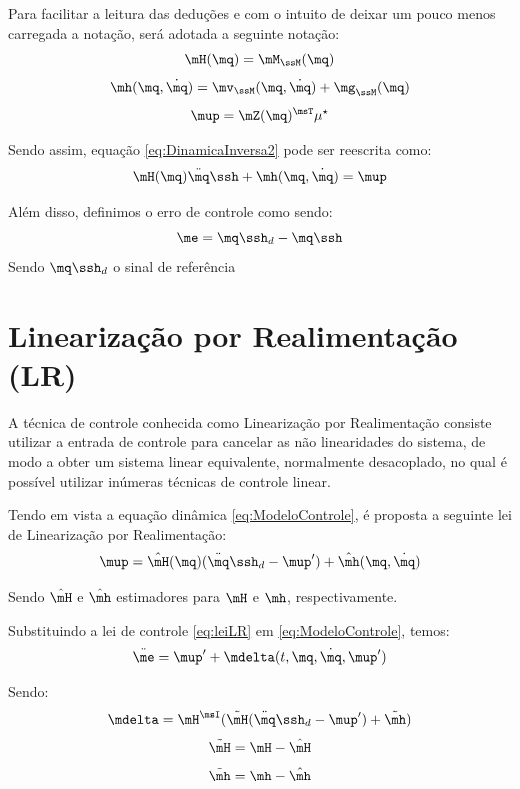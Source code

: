 \documentclass[]{politex}
\begin{document}
Para facilitar a leitura das deduções e com o intuito de deixar um pouco menos carregada a notação, será adotada a seguinte notação:
\begin{equation}
\mH(\mq) = \mM_{\ssM}(\mq)
\end{equation}
\begin{equation}
\mh(\mq, \dot{\mq}) = \mv_{\ssM}(\mq, \dot{\mq}) + \mg_{\ssM}(\mq)
\end{equation}
\begin{equation}
\mup = \mZ(\mq)^{\msT} \mu^\star
\end{equation}

Sendo assim, equação \eqref{eq:DinamicaInversa2} pode ser reescrita como:
\begin{equation} \label{eq:ModeloControle}
\mH(\mq)  \ddot{\mq}\ssh + \mh(\mq,\dot{\mq}) = \mup
\end{equation}

Além disso, definimos o erro de controle como sendo:
\begin{equation}
\me = \mq\ssh_d - \mq\ssh
\end{equation}
Sendo $\mq\ssh_d$ o sinal de referência

\section{Linearização por Realimentação (LR)}

A técnica de controle conhecida como Linearização por Realimentação consiste utilizar a entrada de controle para cancelar as não linearidades do sistema, de modo a obter um sistema linear equivalente, normalmente desacoplado, no qual é possível utilizar inúmeras técnicas de controle linear.

Tendo em vista a equação dinâmica \eqref{eq:ModeloControle}, é proposta a seguinte lei de Linearização por Realimentação:
\begin{equation} \label{eq:leiLR}
\mup = \hat{\mH}(\mq) (\ddot{\mq}\ssh_d - \mup' ) + \hat{\mh}(\mq,\dot{\mq})
\end{equation}

Sendo $\hat{\mH}$ e $\hat{\mh}$ estimadores para $\mH$ e $\mh$, respectivamente.

Substituindo a lei de controle \eqref{eq:leiLR} em \eqref{eq:ModeloControle}, temos:
\begin{equation} \label{eq:ModeloLin}
\ddot{\me}  = \mup' + \mdelta(t,\mq,\dot{\mq}, \mup')
\end{equation}

Sendo:
\begin{equation}
\mdelta = \mH^\msI( \tilde{\mH}(\ddot{\mq}\ssh_d - \mup') + \tilde{\mh} )
\end{equation}
\begin{equation} \label{eq:Htil}
\tilde{\mH} = \mH - \hat{\mH}
\end{equation} 
\begin{equation} \label{eq:htil}
\tilde{\mh} = \mh - \hat{\mh}
\end{equation}
\end{document}
